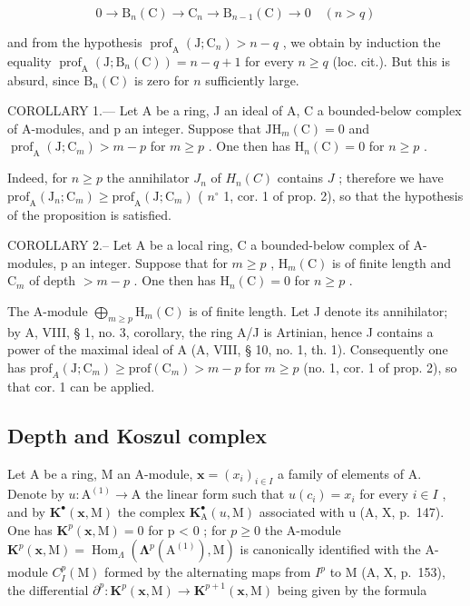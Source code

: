 \[
0 \to \mathrm{B} _ {n} (\mathrm{C}) \to \mathrm{C} _ {n} \to \mathrm{B} _ {n - 1} (\mathrm{C}) \to 0 \quad (n > q)
\]

and from the hypothesis \(\operatorname{prof}_{\mathrm{A}}(\mathrm{J};\mathrm{C}_{n}) > n - q\) , we obtain by induction the equality \(\operatorname{prof}_{\mathrm{A}}(\mathrm{J};\mathrm{B}_{n}(\mathrm{C})) = n - q + 1\) for every \(n \geqslant q\) (loc. cit.). But this is absurd, since \(\mathrm{B}_{n}(\mathrm{C})\) is zero for \(n\) sufficiently large.

COROLLARY 1.--- Let A be a ring, J an ideal of A, C a bounded-below complex of A-modules, and p an integer. Suppose that \(\mathrm{JH}_{m}(\mathrm{C}) = 0\) and \(\operatorname{prof}_{\mathrm{A}}(\mathrm{J}; \mathrm{C}_{m}) > m - p\) for \(m \geqslant p\) . One then has \(\mathrm{H}_{n}(\mathrm{C}) = 0\) for \(n \geqslant p\) .

Indeed, for \(n \geqslant p\) the annihilator \(J_n\) of \(H_n(C)\) contains \(J\) ; therefore we have \(\mathrm{prof}_{\mathrm{A}}(\mathrm{J}_{n};\mathrm{C}_{m}) \geqslant \mathrm{prof}_{\mathrm{A}}(\mathrm{J};\mathrm{C}_{m})\) ( \(n^{\circ}\) 1, cor. 1 of prop. 2), so that the hypothesis of the proposition is satisfied.

COROLLARY 2.-- Let A be a local ring, C a bounded-below complex of A-modules, p an integer. Suppose that for \(m \geqslant p\) , \(\mathrm{H}_{m}(\mathrm{C})\) is of finite length and \(\mathrm{C}_{m}\) of depth \(>m-p\) . One then has \(\mathrm{H}_{n}(\mathrm{C}) = 0\) for \(n \geqslant p\) .

The A-module \(\bigoplus_{m\geqslant p}\mathrm{H}_{m}(\mathrm{C})\) is of finite length. Let J denote its annihilator; by A, VIII, § 1, no. 3, corollary, the ring A/J is Artinian, hence J contains a power of the maximal ideal of A (A, VIII, § 10, no. 1, th. 1). Consequently one has \(\mathrm{prof}_A(\mathrm{J};\mathrm{C}_m)\geqslant \mathrm{prof}(\mathrm{C}_m) > m - p\) for \(m\geqslant p\) (no. 1, cor. 1 of prop. 2), so that cor. 1 can be applied.

\subsection{Depth and Koszul complex}

Let A be a ring, M an A-module, \(\mathbf{x} = (x_i)_{i \in I}\) a family of elements of A. Denote by \(u : \mathrm{A}^{(1)} \to \mathrm{A}\) the linear form such that \(u(c_i) = x_i\) for every \(i \in I\) , and by \(\mathbf{K}^{\bullet}(\mathbf{x}, \mathrm{M})\) the complex \(\mathbf{K}_{\mathrm{A}}^{\bullet}(u, \mathrm{M})\) associated with u (A, X, p.~147). One has \(\mathbf{K}^p(\mathbf{x}, \mathrm{M}) = 0\) for p \textless{} 0 ; for \(p \geqslant 0\) the A-module \(\mathbf{K}^p(\mathbf{x}, \mathrm{M}) = \operatorname{Hom}_{\Lambda} (\boldsymbol{\Lambda}^p(\mathrm{A}^{(1)}), \mathrm{M})\) is canonically identified with the A-module \(C_I^p(\mathrm{M})\) formed by the alternating maps from \(I^p\) to M (A, X, p.~153), the differential \(\partial^p : \mathbf{K}^p(\mathbf{x}, \mathrm{M}) \longrightarrow \mathbf{K}^{p+1}(\mathbf{x}, \mathrm{M})\) being given by the formula

